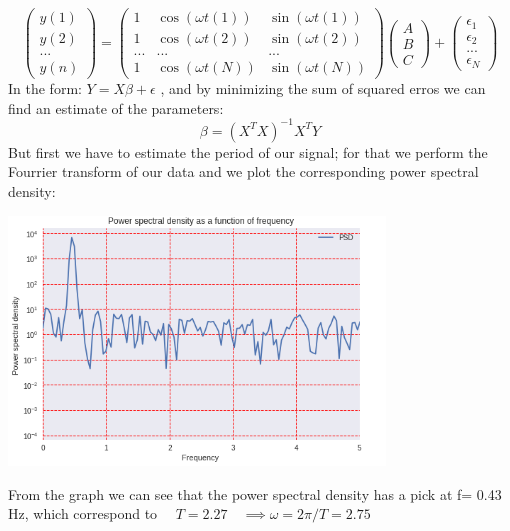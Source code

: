 \documentclass[12pt,a4paper]{report}
\begin{document}
$$ \left(\begin{array}{ccc} y(1)  \\ y(2)  \\ ... \\ y(n) \end{array}\right)
= \left(\begin{array}{ccc} 1 & \cos (\omega t(1)) & \sin(\omega t(1)) \\ 1 & \cos (\omega t(2)) & \sin(\omega t(2))  \\ ... & ...& ...\\ 1 & \cos (\omega t(N)) & \sin(\omega t(N)) \end{array}\right) 
\left(\begin{array}{ccc} A \\ B  \\ C \end{array}\right) + \left(\begin{array}{ccc} \epsilon_1 \\ \epsilon_2  \\ ... \\ \epsilon_N \end{array}\right)$$
In the form: $ Y= X \beta + \epsilon $ , and by minimizing the sum of squared erros we can find an estimate of the parameters:
$$ \beta = {(X^T X)}^{-1} X^T Y $$
But first we have to estimate the period of our signal; for that we perform the Fourrier transform of our data and we plot the corresponding power spectral density:

\begin{center}
\includegraphics[width=10cm]{Capture3_bis.png}
\end{center}

From the graph we can see that the power spectral density has a pick at f= 0.43 Hz, which correspond to $\quad T=2.27  \quad \implies \omega = 2 \pi/T = 2.75 $
\end{document}
